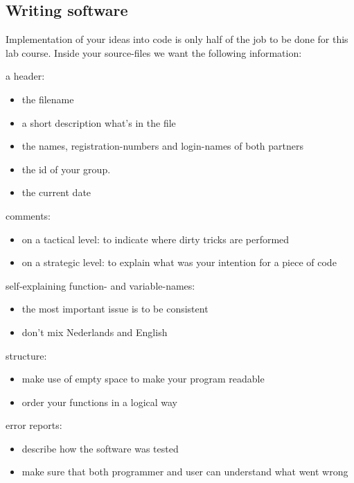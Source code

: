 \documentclass[10pt]{scrartcl}
\begin{document}
\subsection{Writing software}
Implementation of your ideas into code is only half of the job to be
done for this lab course. Inside your source-files we want the
following information:

\begin{description}
\addtolength{\itemsep}{-.05cm}
\item a header:   
\addtolength{\itemsep}{-.05cm}
  \begin{itemize}
    \addtolength{\itemsep}{-.05cm}
    \item the filename
    \item a short description what's in the file
    \item the names, registration-numbers and login-names of both partners
    \item the id of your group.
    \item the current date
  \end{itemize}
\item comments:   
  \begin{itemize}
    \addtolength{\itemsep}{-.05cm}
    \item on a tactical level: to indicate where dirty tricks are performed
    \item on a strategic level: to explain what was your intention
      for a piece of code
  \end{itemize}
\item self-explaining function- and variable-names:   
  \begin{itemize}
    \addtolength{\itemsep}{-.05cm}
    \item the most important issue is to be consistent
    \item don't mix Nederlands and English
  \end{itemize}
\item structure:   
  \begin{itemize}
    \addtolength{\itemsep}{-.05cm}
    \item make use of empty space to make your program readable
    \item order your functions in a logical way
  \end{itemize}
\item error reports:   
  \begin{itemize}
    \addtolength{\itemsep}{-.05cm}
    \item describe how the software was tested
    \item make sure that both programmer and user can understand
      what went wrong
  \end{itemize}
\end{description}
\end{document}
